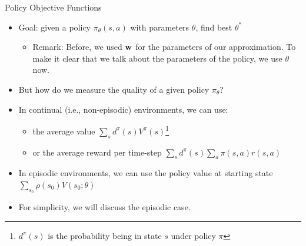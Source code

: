 \documentclass[aspectratio=169]{../latex_main/tntbeamer}  %
\begin{document}
\begin{frame}[c]{Policy Objective Functions}
	
	\begin{itemize}
		\item Goal: given a policy $\pi_\theta(s,a)$ with parameters $\theta$, find best $\theta^*$
		\begin{itemize}
		    \item \alert{Remark}: Before, we used $\mathbf{w}$ for the parameters of our approximation. To make it clear that we talk about the parameters of the policy, we use $\theta$ now.
		\end{itemize}
		\item But how do we measure the quality of a given policy $\pi_\theta$?
		\item In continual (i.e., non-episodic) environments, we can use:
		\begin{itemize}
		    \item the average value $\sum_{s} d^{\pi}(s) V^{\pi}(s)$\footnote{$d^\pi(s)$ is the probability being in state $s$ under policy $\pi$}
		    \item or the average reward per time-step $\sum_{s} d^{\pi}(s) \sum_{a} \pi(s,a)r(s,a)$
		\end{itemize}
        \item In episodic environments, we can use the policy value at starting state $\sum_{s_0} \rho(s_0) V(s_0; \theta)$
		\item For simplicity, we will discuss the episodic case.
	\end{itemize}
	
\end{frame}
\end{document}
